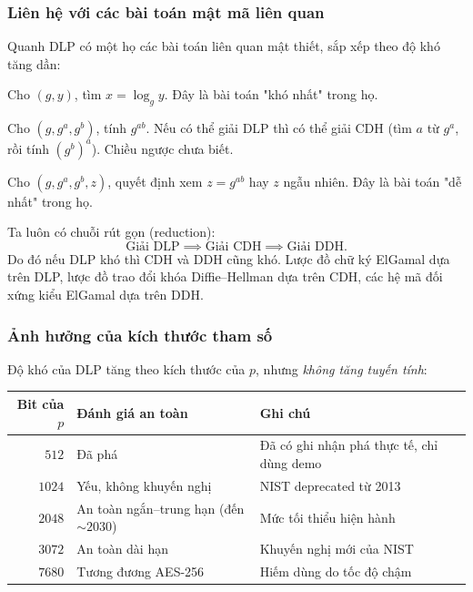 \documentclass[12pt,a4paper]{report}
\theoremstyle{definition}
\theoremstyle{remark}
\begin{document}
\subsubsection{Liên hệ với các bài toán mật mã liên quan}

Quanh DLP có một họ các bài toán liên quan mật thiết, sắp xếp theo độ khó tăng dần:

\begin{description}[leftmargin=*]
    \item[\textsc{DLP} (Discrete Logarithm Problem).] Cho $(g, y)$, tìm $x = \log_g y$. Đây là bài toán "khó nhất" trong họ.
    
    \item[\textsc{CDH} (Computational Diffie--Hellman).] Cho $(g, g^a, g^b)$, tính $g^{ab}$. Nếu có thể giải DLP thì có thể giải CDH (tìm $a$ từ $g^a$, rồi tính $(g^b)^a$). Chiều ngược chưa biết.
    
    \item[\textsc{DDH} (Decisional Diffie--Hellman).] Cho $(g, g^a, g^b, z)$, quyết định xem $z = g^{ab}$ hay $z$ ngẫu nhiên. Đây là bài toán "dễ nhất" trong họ.
\end{description}

Ta luôn có chuỗi rút gọn (reduction):
\[
\text{Giải DLP} \implies \text{Giải CDH} \implies \text{Giải DDH}.
\]
Do đó nếu DLP khó thì CDH và DDH cũng khó. Lược đồ chữ ký ElGamal dựa trên DLP, lược đồ trao đổi khóa Diffie--Hellman dựa trên CDH, các hệ mã đối xứng kiểu ElGamal dựa trên DDH.

\subsubsection{Ảnh hưởng của kích thước tham số}

Độ khó của DLP tăng theo kích thước của $p$, nhưng \emph{không tăng tuyến tính}:

\begin{center}
\renewcommand{\arraystretch}{1.2}
\begin{tabular}{rll}
\toprule
\textbf{Bit của $p$} & \textbf{Đánh giá an toàn} & \textbf{Ghi chú} \\
\midrule
$512$ & Đã phá & Đã có ghi nhận phá thực tế, chỉ dùng demo \\
$1024$ & Yếu, không khuyến nghị & NIST deprecated từ 2013 \\
$2048$ & An toàn ngắn--trung hạn (đến $\sim 2030$) & Mức tối thiểu hiện hành \\
$3072$ & An toàn dài hạn & Khuyến nghị mới của NIST \\
$7680$ & Tương đương AES-256 & Hiếm dùng do tốc độ chậm \\
\bottomrule
\end{tabular}
\end{center}
\end{document}
